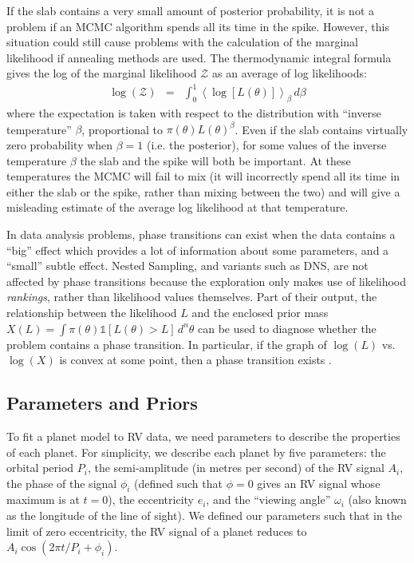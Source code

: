 \documentclass[useAMS,usenatbib]{mn2e}
\begin{document}
If the slab contains a very small amount of posterior probability, it is not
a problem if an MCMC algorithm spends all its time in the spike. However, this
situation could still cause problems with the calculation of the marginal likelihood
if annealing methods are used. The thermodynamic integral formula gives
the log of the marginal likelihood $\mathcal{Z}$ as an average of log likelihoods:
\begin{eqnarray}
\log(\mathcal{Z}) &=& \int_0^1 \left<\log\left[L(\theta)\right]\right>_\beta \, d\beta
\end{eqnarray}
where the expectation is taken with respect to the
distribution with ``inverse temperature'' $\beta$, proportional to
$\pi(\theta)L(\theta)^\beta$. Even if the slab contains virtually zero probability
when $\beta=1$ (i.e. the posterior), for some values of the inverse temperature
$\beta$ the slab and the spike will both be important. At
these temperatures the MCMC will fail to mix (it will incorrectly spend all its
time in either the slab or the spike, rather than mixing between the two)
and will give a misleading estimate of the average log likelihood at that temperature.

In data analysis problems, phase transitions can exist when the data contains
a ``big'' effect which provides a lot of information about some parameters, and
a ``small'' subtle effect.
Nested Sampling, and variants such as DNS, are not affected
by phase transitions because the exploration only makes use of likelihood
{\it rankings}, rather than likelihood values themselves.
Part of their output, the relationship between the
likelihood $L$ and the enclosed prior mass
$X(L) = \int \pi(\theta) \mathds{1}\left[L(\theta) > L\right]\, d^n\theta$
can be used to diagnose whether the
problem contains a phase transition. In particular, if the graph of $\log(L)$
vs. $\log(X)$ is convex at some point, then a phase transition exists
\citep{skilling}.

\subsection{Parameters and Priors}
To fit a planet model to RV data, we need parameters to describe
the properties of each planet. For simplicity, we describe each planet by
five parameters: the orbital period $P_i$, the semi-amplitude (in metres
per second) of the RV signal $A_i$, the phase of the signal
$\phi_i$ (defined such that $\phi=0$ gives an RV signal whose maximum is at
$t=0$), the eccentricity $e_i$, and the ``viewing angle'' $\omega_i$
(also known as the longitude of the line of sight). We defined our parameters
such that in the limit of zero eccentricity, the RV signal of a planet
reduces to $A_i\cos\left(2\pi t/P_i + \phi_i\right)$.
\end{document}
